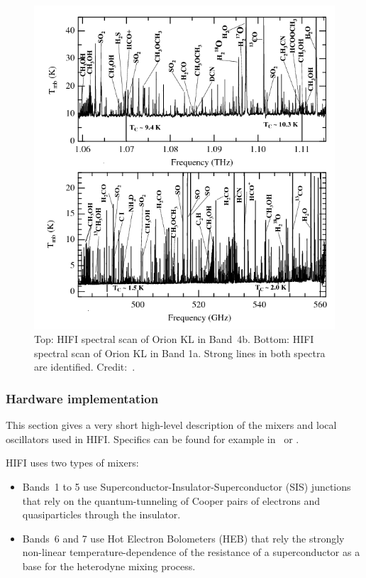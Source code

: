 \begin{figure}[hbp]
    \centering
    \includegraphics[width=.6\textwidth]{hifi_hexos}
    \caption{Top: HIFI spectral scan of Orion KL in Band~4b. Bottom: HIFI spectral scan of Orion KL in Band 1a. Strong lines in both spectra are identified.  Credit:~\parencite{bergin2010herschel}.
    }
    \label{fig:hexos}
\end{figure}



\clearpage
\subsubsection{Hardware implementation}

This section gives a very short high-level description of the mixers and local oscillators used in HIFI.
Specifics can be found for example in~\textcites{pearson2000local}{pearson2003terahertz}{jackson2006low} or \textcite{kooi2008}.

\begin{samepage}
HIFI uses two types of mixers:
\begin{itemize}[noitemsep,nolistsep]
    \item Bands~1 to 5 use
Superconductor-Insulator-Superconductor (SIS) junctions that rely on the quantum-tunneling of Cooper pairs of electrons and quasiparticles through the insulator.
    \item Bands~6 and 7 use  Hot Electron Bolometers (HEB) that rely the strongly non-linear temperature-dependence of the resistance of a superconductor as a base for the heterodyne mixing process.
\end{itemize}
\end{samepage}

